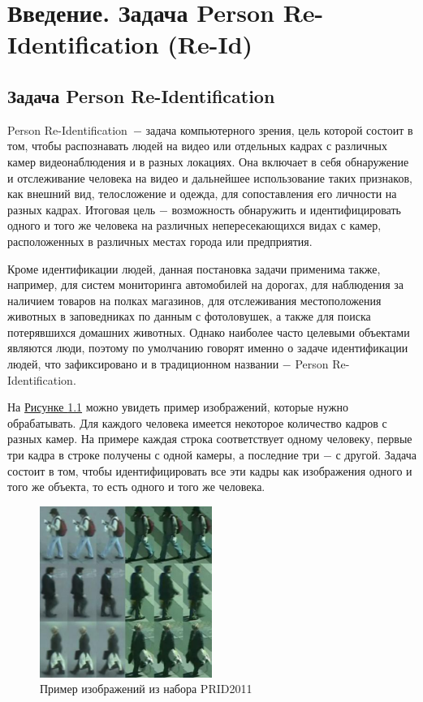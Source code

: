 \chapter{Введение. Задача Person Re-Identification (Re-Id)}
\label{ch:введение}

\newcommand{\reid}{Person Re-Identification}
\newcommand{\bbox}{bounding box}

\section{Задача Person Re-Identification}

\reid\ $-$ задача компьютерного зрения, цель которой состоит в том, чтобы распознавать людей на видео или отдельных кадрах с различных камер видеонаблюдения и в разных локациях. Она включает в себя обнаружение и отслеживание человека на видео и дальнейшее использование таких признаков, как внешний вид, телосложение и одежда, для сопоставления его личности на разных кадрах. Итоговая цель $-$ возможность обнаружить и идентифицировать одного и того же человека на различных непересекающихся видах с камер, расположенных в различных местах города или предприятия. 

Кроме идентификации людей, данная постановка задачи применима также, например, для систем мониторинга автомобилей на дорогах, для наблюдения за наличием товаров на полках магазинов, для отслеживания местоположения животных в заповедниках по данным с фотоловушек, а также для поиска потерявшихся домашних животных. Однако наиболее часто целевыми объектами являются люди, поэтому по умолчанию говорят именно о задаче идентификации людей, что зафиксировано и в традиционном названии $-$ \reid.

На \hyperref[fig:prid_2022_images_example]{Рисунке \ref*{fig:prid_2022_images_example}} можно увидеть пример изображений, которые нужно обрабатывать. Для каждого человека имеется некоторое количество кадров с разных камер. На примере каждая строка соответствует одному человеку, первые три кадра в строке получены с одной камеры, а последние три $-$ с другой. Задача состоит в том, чтобы идентифицировать все эти кадры как изображения одного и того же объекта, то есть одного и того же человека.

\begin{figure}[ht]
    \centering
    \includegraphics[width=0.5\textwidth]{images/reid_problem/prid2011.png}
    \caption{Пример изображений из набора PRID2011 \cite{hirzer2011person}}
    \label{fig:prid_2022_images_example}
\end{figure}

